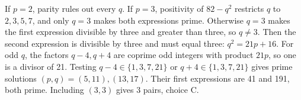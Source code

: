 If $p=2$, parity rules out every $q$. If $p=3$, positivity of $82-q^2$ restricts $q$ to $2,3,5,7$, and only $q=3$ makes both expressions prime. Otherwise $q=3$ makes the first expression divisible by three and greater than three, so $q\ne3$. Then the second expression is divisible by three and must equal three: $q^2=21p+16$. For odd $q$, the factors $q-4,q+4$ are coprime odd integers with product $21p$, so one is a divisor of 21. Testing $q-4\in\{1,3,7,21\}$ or $q+4\in\{1,3,7,21\}$ gives prime solutions $(p,q)=(5,11),(13,17)$. Their first expressions are 41 and 191, both prime. Including $(3,3)$ gives $\boxed{3}$ pairs, choice C.

